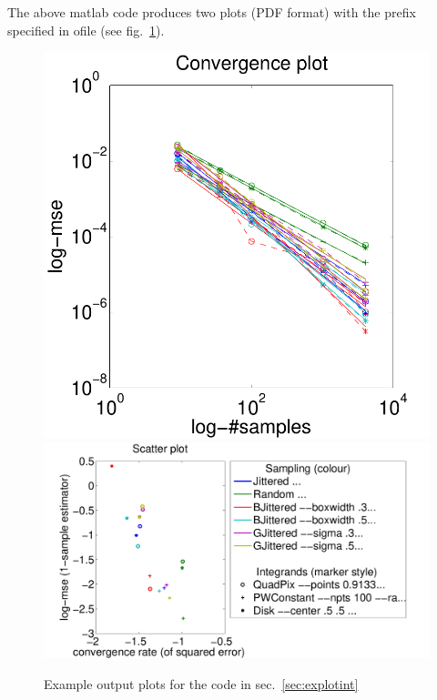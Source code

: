 The above matlab code produces two plots (PDF format) with the prefix specified in ofile (see fig.~\ref{fig:explotint}). 
\begin{figure}[htbp]
\includegraphics[width=0.36\linewidth]{figs/test-convs.pdf} 
\includegraphics[width=0.64\linewidth]{figs/test-scatter.pdf}
\caption{\label{fig:explotint} Example output plots for the code in sec.~\ref{sec:explotint}}
\end{figure}

